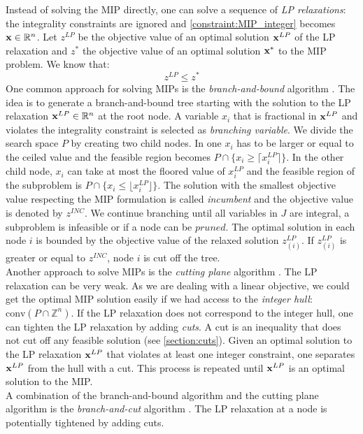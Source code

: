Instead of solving the MIP directly, one can solve a sequence of \textit{LP relaxations}: the integrality constraints are ignored and \cref{constraint:MIP_integer} becomes $\bold x \in \mathbb{R}^n$.
Let $z^{LP}$ be the objective value of an optimal solution $\bold{x}^{LP}$ of the LP relaxation and $z^*$ the objective value of an optimal solution $\bold{x^*}$ to the MIP problem. We know that: 
\begin{equation*} \label{Eq:bound}
    z^{LP} \leq z^*
\end{equation*}
One common approach for solving MIPs is the \textit{branch-and-bound} algorithm \cite{integer_programming}. The idea is to generate a branch-and-bound tree starting with the solution to the LP relaxation $\bold x^{LP} \in \mathbb{R}^n$ at the root node. A variable $x_i$ that is fractional in $\bold x^{LP}$ and violates the integrality constraint is selected as \textit{branching variable}. We divide the search space $P$ by creating two child nodes. In one $x_i$ has to be larger or equal to the ceiled value and the feasible region becomes $P \cap \{x_i \geq \lceil x_i^{LP} \rceil \}$. In the other child node, $x_i$ can take at most the floored value of $x_i^{LP}$ and the feasible region of the subproblem is $P \cap \{x_i \leq \lfloor x_i^{LP} \rfloor \}$. The solution with the smallest objective value respecting the MIP formulation is called \textit{incumbent} and the objective value is denoted by $z^{INC}$. We continue branching until all variables in $J$ are integral, a subproblem is infeasible or if a node can be $pruned$. The optimal solution in each node $i$ is bounded by the objective value of the relaxed solution $z^{LP}_{(i)}$. If $z^{LP}_{(i)}$ is greater or equal to $z^{INC}$, node $i$ is cut off the tree. \\
Another approach to solve MIPs is the \textit{cutting plane} algorithm \cite{integer_programming}. The LP relaxation can be very weak. As we are dealing with a linear objective, we could get the optimal MIP solution easily if we had access to the \textit{integer hull}: $\text{conv}(P \cap \mathbb{Z}^n)$. If the LP relaxation does not correspond to the integer hull, one can tighten the LP relaxation by adding \textit{cuts}. A cut is an inequality that does not cut off any feasible solution (see \cref{section:cuts}). Given an optimal solution to the LP relaxation $\bold x^{LP}$ that violates at least one integer constraint, one separates $\bold x^{LP}$ from the hull with a cut. This process is repeated until $\bold x^{LP}$ is an optimal solution to the MIP. \\
A combination of the branch-and-bound algorithm and the cutting plane algorithm is the \textit{branch-and-cut} algorithm \cite{integer_programming}. The LP relaxation at a node is potentially tightened by adding cuts. 

